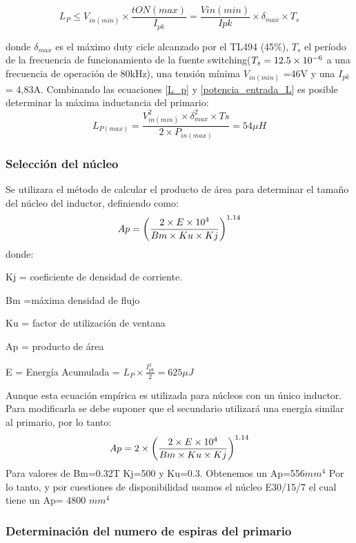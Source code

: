 \begin{equation}
L_P \leq V_{in(min)} \times \frac{t{ON(max)}}{I_{pk}}= \frac{V{in(min)}}{Ipk} \times \delta_{max} \times T_s \label{L_p}   
\end{equation}

donde  $\delta_{max}$ es el máximo duty cicle alcanzado por el TL494 (45$\%$), $T_s$ el período de la frecuencia de funcionamiento de la fuente switching($T_s =12.5\times 10^{-6}$ a una frecuencia de operación de 80kHz), una tensión mínima $V_{in(min)}$ =46V y una $I_{pk}$= 4,83A.
Combinando las ecuaciones \ref{L_p} y \ref{potencia_entrada_L} es posible determinar la máxima inductancia del primario:
$$
L_{P(max)} = \frac{V_{in(min)}^2 \times \delta_{max}^2 \times Ts}{2 \times P_{in(max)}} = 54\mu H
$$


\subsubsection{Selección del núcleo}


Se utilizara el método de calcular el producto de área para determinar el tamaño del núcleo del inductor, definiendo como:
$$
Ap= {\left( \frac{  2 \times E \times 10^{4}}{Bm \times Ku \times Kj} \right) } ^{ 1.14}
$$
donde:
\begin{list}{ }
 \item Kj = coeficiente de densidad de corriente.
\item Bm =máxima densidad  de flujo 
\item Ku = factor de utilización de ventana 
\item Ap = producto de área 
\item E = Energía Acumulada = $ L_P \times \frac{I_{pk}^2 }{2} = 625 \mu J $ 
\item
\end{list}

Aunque esta ecuación empírica es utilizada para núcleos con un único inductor. Para modificarla se debe suponer que el secundario utilizará una energía similar al primario, por lo tanto:
$$
A p= 2 \times {\left( \frac{  2 \times E \ensuremath{\times 10^{4}}}{Bm \times Ku \times Kj} \right) } ^{ 1.14}
$$
Para valores de Bm=0.32T  Kj=500 y Ku=0.3. Obtenemos un Ap=556$mm^4$
Por lo tanto, y por cuestiones de disponibilidad usamos el núcleo E30/15/7 el cual tiene un Ap= 4800 $mm^4$

\subsubsection{Determinación del numero de espiras del primario}

